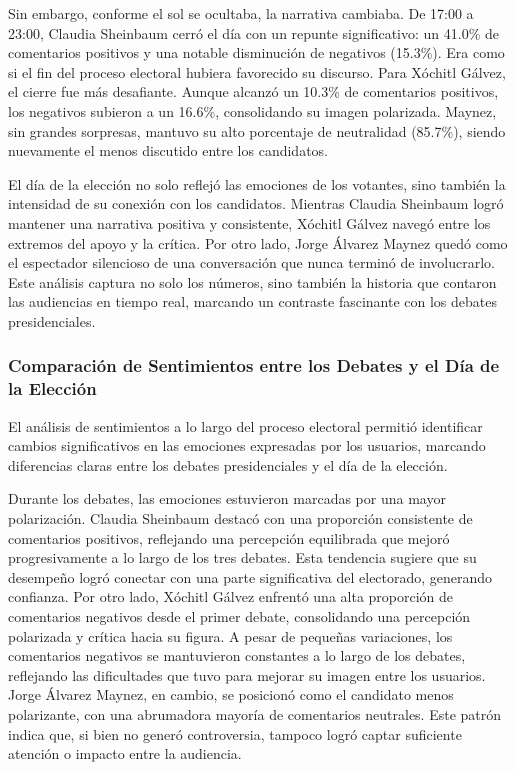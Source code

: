 \documentclass[10pt, a4paper]{article}
\begin{document}
	Sin embargo, conforme el sol se ocultaba, la narrativa cambiaba. De 17:00 a 23:00, Claudia Sheinbaum cerró el día con un repunte significativo: un 41.0\% de comentarios positivos y una notable disminución de negativos (15.3\%). Era como si el fin del proceso electoral hubiera favorecido su discurso. Para Xóchitl Gálvez, el cierre fue más desafiante. Aunque alcanzó un 10.3\% de comentarios positivos, los negativos subieron a un 16.6\%, consolidando su imagen polarizada. Maynez, sin grandes sorpresas, mantuvo su alto porcentaje de neutralidad (85.7\%), siendo nuevamente el menos discutido entre los candidatos.
	
	El día de la elección no solo reflejó las emociones de los votantes, sino también la intensidad de su conexión con los candidatos. Mientras Claudia Sheinbaum logró mantener una narrativa positiva y consistente, Xóchitl Gálvez navegó entre los extremos del apoyo y la crítica. Por otro lado, Jorge Álvarez Maynez quedó como el espectador silencioso de una conversación que nunca terminó de involucrarlo. Este análisis captura no solo los números, sino también la historia que contaron las audiencias en tiempo real, marcando un contraste fascinante con los debates presidenciales.
	
	
	\subsubsection{Comparación de Sentimientos entre los Debates y el Día de la Elección}
	
	El análisis de sentimientos a lo largo del proceso electoral permitió identificar cambios significativos en las emociones expresadas por los usuarios, marcando diferencias claras entre los debates presidenciales y el día de la elección.
	
	Durante los debates, las emociones estuvieron marcadas por una mayor polarización. Claudia Sheinbaum destacó con una proporción consistente de comentarios positivos, reflejando una percepción equilibrada que mejoró progresivamente a lo largo de los tres debates. Esta tendencia sugiere que su desempeño logró conectar con una parte significativa del electorado, generando confianza. Por otro lado, Xóchitl Gálvez enfrentó una alta proporción de comentarios negativos desde el primer debate, consolidando una percepción polarizada y crítica hacia su figura. A pesar de pequeñas variaciones, los comentarios negativos se mantuvieron constantes a lo largo de los debates, reflejando las dificultades que tuvo para mejorar su imagen entre los usuarios. Jorge Álvarez Maynez, en cambio, se posicionó como el candidato menos polarizante, con una abrumadora mayoría de comentarios neutrales. Este patrón indica que, si bien no generó controversia, tampoco logró captar suficiente atención o impacto entre la audiencia.
	
\end{document}
